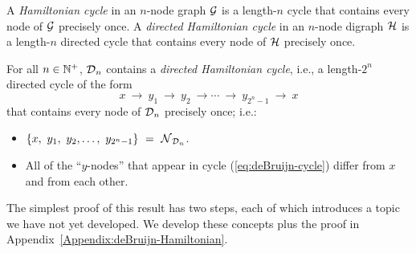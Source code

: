 A {\it Hamiltonian cycle} in an $n$-node graph $\mbox{$\cal G$}$ is a length-$n$
cycle that contains every node of $\mbox{$\cal G$}$ precisely once.  A {\it
  directed Hamiltonian cycle} in an $n$-node digraph $\mbox{$\cal H$}$ is a
length-$n$ directed cycle that contains every node of $\mbox{$\cal H$}$ precisely
once.

\begin{prop}
\label{thm:deBruijn-Hamiltonian}
For all $n \in \mathbb{N}^+$, $\mbox{$\cal D$}_n$ contains a {\em directed Hamiltonian
  cycle}, 
i.e., a length-$2^n$ directed cycle of the form
\begin{equation}
\label{eq:deBruijn-cycle}
 x \ \rightarrow \ y_1 \ \rightarrow \ y_2 \ \rightarrow \cdots
\ \rightarrow \ y_{2^n-1} \ \rightarrow \ x
\end{equation}
that contains every node of $\mbox{$\cal D$}_n$ precisely once; i.e.:
\begin{itemize}
\item
$\{x, \ y_1, \ y_2, \ldots, \ y_{2^n-1}\} \ = \ \n_{\fd_n}$.
\item
All of the ``$y$-nodes'' that appear in cycle
(\ref{eq:deBruijn-cycle}) differ from $x$ and from each other.
\end{itemize}
\end{prop}

The simplest proof of this result has two steps, each of which
introduces a topic we have not yet developed.  We develop these concepts plus the proof in 
Appendix~\ref{Appendix:deBruijn-Hamiltonian}.


